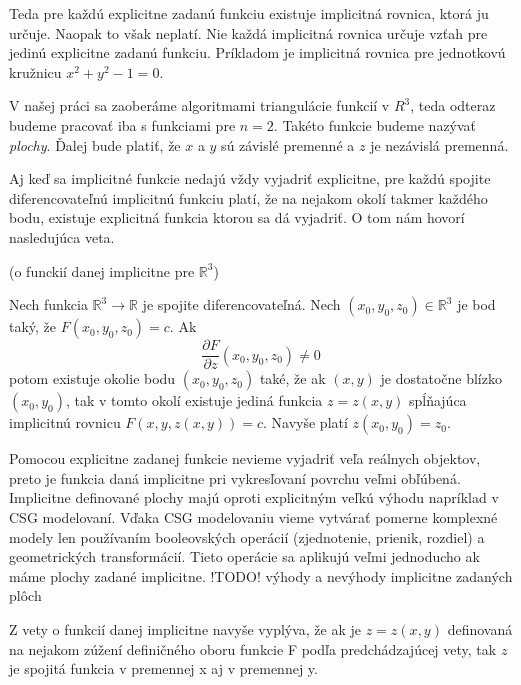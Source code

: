 Teda pre každú explicitne zadanú funkciu existuje implicitná rovnica, ktorá ju určuje.
Naopak to však neplatí. Nie každá implicitná rovnica určuje vzťah pre jedinú explicitne zadanú
funkciu. Príkladom je implicitná rovnica pre jednotkovú kružnicu $x^2 + y^2 - 1 = 0$. 


V našej práci sa zaoberáme algoritmami triangulácie funkcií v $R^3$, teda odteraz
budeme pracovať iba s funkciami pre $n = 2$. Takéto funkcie budeme nazývať \textit{plochy}. 
Ďalej bude platiť, že $x$ a $y$ sú závislé premenné a $z$ je nezávislá premenná.


Aj keď sa implicitné funkcie nedajú vždy vyjadriť explicitne, pre každú spojite diferencovateľnú
implicitnú funkciu platí, že na nejakom okolí takmer každého bodu, existuje explicitná funkcia
ktorou sa dá vyjadriť.
O tom nám hovorí nasledujúca veta.





\begin{theorem}
 (o funckií danej implicitne pre $\mathbb{R}^3$)
 
 Nech funkcia $\mathbb{R}^3 \to \mathbb{R}$ je spojite diferencovateľná. 
 Nech $(x_0, y_0, z_0) \in \mathbb{R}^3$ je bod taký, že $F(x_0, y_0, z_0) = c$.
 Ak $$\frac{\partial F}{\partial z} (x_0, y_0, z_0) \neq 0$$ potom existuje okolie 
 bodu $(x_0, y_0, z_0)$ také, že ak $(x, y)$ je dostatočne blízko $(x_0, y_0)$, 
 tak v tomto okolí existuje jediná funkcia $z = z(x ,y)$ spĺňajúca implicitnú rovnicu
 $F(x, y, z(x, y)) = c$. Navyše platí $z(x_0, y_0) = z_0$.
\end{theorem}

Pomocou explicitne zadanej funkcie nevieme vyjadriť veľa reálnych objektov, 
preto je funkcia daná implicitne pri vykresľovaní povrchu veľmi obľúbená. 
Implicitne definované plochy majú oproti explicitným veľkú výhodu napríklad
v CSG modelovaní. Vďaka CSG modelovaniu vieme vytvárať pomerne komplexné
modely len používaním booleovských operácií (zjednotenie, prienik, rozdiel)
a geometrických transformácií. Tieto operácie sa aplikujú veľmi jednoducho ak
máme plochy zadané implicitne.
!TODO! výhody a nevýhody implicitne zadaných plôch


\begin{note}
    Z vety o funkcií danej implicitne navyše vyplýva, že ak je $z = z(x,y)$ definovaná na nejakom 
    zúžení definičného oboru funkcie F podľa predchádzajúcej vety, tak $z$ je spojitá funkcia v 
    premennej x aj v premennej y. 
\end{note}

